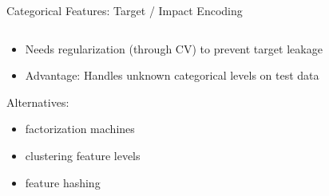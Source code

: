 \begin{frame}{Categorical Features: Target / Impact Encoding}
\begin{columns}
\begin{column}{0.7\textwidth}
\begin{itemize}
        \item Needs regularization (through CV) to prevent target leakage 
        \item Advantage: Handles unknown categorical levels on test data
      \end{itemize}
      Alternatives: 
      \begin{itemize}
    \item factorization machines 
    \item clustering feature levels 
    \item feature hashing
      \end{itemize}
    \end{column}%
    \begin{column}{0.3\textwidth}
      \vspace{-1cm}
      \begin{center}
\end{center}
\end{column}
\end{columns}
\end{frame}
